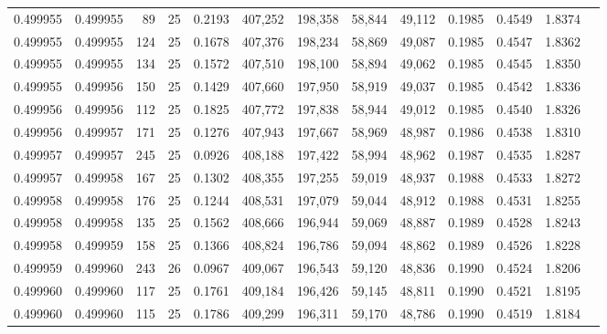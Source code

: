 \begin{tabular}{rrrrrrrrrrrrr}
0.499955 & 0.499955 &  89 &  25 &                                     0.2193 & 407,252 & 198,358 &  58,844 &  49,112 & 0.1985 & 0.4549 & 1.8374 \\
0.499955 & 0.499955 & 124 &  25 &                                     0.1678 & 407,376 & 198,234 &  58,869 &  49,087 & 0.1985 & 0.4547 & 1.8362 \\
0.499955 & 0.499955 & 134 &  25 &                                     0.1572 & 407,510 & 198,100 &  58,894 &  49,062 & 0.1985 & 0.4545 & 1.8350 \\
0.499955 & 0.499956 & 150 &  25 &                                     0.1429 & 407,660 & 197,950 &  58,919 &  49,037 & 0.1985 & 0.4542 & 1.8336 \\
0.499956 & 0.499956 & 112 &  25 &                                     0.1825 & 407,772 & 197,838 &  58,944 &  49,012 & 0.1985 & 0.4540 & 1.8326 \\
0.499956 & 0.499957 & 171 &  25 &                                     0.1276 & 407,943 & 197,667 &  58,969 &  48,987 & 0.1986 & 0.4538 & 1.8310 \\
0.499957 & 0.499957 & 245 &  25 &                                     0.0926 & 408,188 & 197,422 &  58,994 &  48,962 & 0.1987 & 0.4535 & 1.8287 \\
0.499957 & 0.499958 & 167 &  25 &                                     0.1302 & 408,355 & 197,255 &  59,019 &  48,937 & 0.1988 & 0.4533 & 1.8272 \\
0.499958 & 0.499958 & 176 &  25 &                                     0.1244 & 408,531 & 197,079 &  59,044 &  48,912 & 0.1988 & 0.4531 & 1.8255 \\
0.499958 & 0.499958 & 135 &  25 &                                     0.1562 & 408,666 & 196,944 &  59,069 &  48,887 & 0.1989 & 0.4528 & 1.8243 \\
0.499958 & 0.499959 & 158 &  25 &                                     0.1366 & 408,824 & 196,786 &  59,094 &  48,862 & 0.1989 & 0.4526 & 1.8228 \\
0.499959 & 0.499960 & 243 &  26 &                                     0.0967 & 409,067 & 196,543 &  59,120 &  48,836 & 0.1990 & 0.4524 & 1.8206 \\
0.499960 & 0.499960 & 117 &  25 &                                     0.1761 & 409,184 & 196,426 &  59,145 &  48,811 & 0.1990 & 0.4521 & 1.8195 \\
0.499960 & 0.499960 & 115 &  25 &                                     0.1786 & 409,299 & 196,311 &  59,170 &  48,786 & 0.1990 & 0.4519 & 1.8184 \\

\end{tabular}
